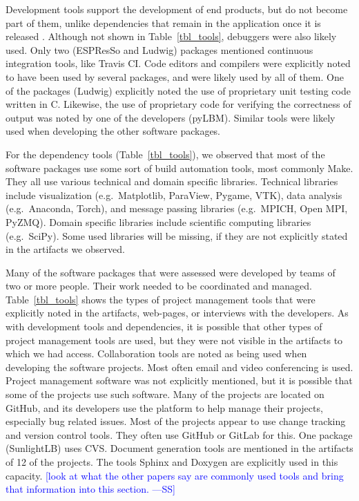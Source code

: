 \documentclass[final, 3p, times, authoryear]{elsarticle}
\newcommand{\authornote}[3]{\textcolor{#1}{[#3 ---#2]}}
\newcommand{\authornote}[3]{}
\newcommand{\wss}[1]{\authornote{blue}{SS}{#1}} %
\begin{document}
Development tools support the development of end products, but do not become
part of them, unlike dependencies that remain in the application once it is
released \citep{ghezzi1991fundamentals}. Although not shown in
Table~\ref{tbl_tools}, debuggers were also likely used.  Only two (ESPResSo and
Ludwig) packages mentioned continuous integration tools, like Travis CI. Code
editors and compilers were explicitly noted to have been used by several
packages, and were likely used by all of them. One of the packages (Ludwig)
explicitly noted the use of proprietary unit testing code written in C.
Likewise, the use of proprietary code for verifying the correctness of output
was noted by one of the developers (pyLBM). Similar tools were likely used when
developing the other software packages.

For the dependency tools (Table~\ref{tbl_tools}), we observed that most of the
software packages use some sort of build automation tools, most commonly Make.
They all use various technical and domain specific libraries. Technical
libraries include visualization (e.g.\ Matplotlib, ParaView, Pygame, VTK), data
analysis (e.g.\ Anaconda, Torch), and message passing libraries (e.g.\ MPICH,
Open MPI, PyZMQ). Domain specific libraries include scientific computing
libraries (e.g.\ SciPy). Some used libraries will be missing, if they are not
explicitly stated in the artifacts we observed.

Many of the software packages that were assessed were developed by teams of two
or more people. Their work needed to be coordinated and managed.
Table~\ref{tbl_tools} shows the types of project management tools that were
explicitly noted in the artifacts, web-pages, or interviews with the developers.
As with development tools and dependencies, it is possible that other types of
project management tools are used, but they were not visible in the artifacts to
which we had access.  Collaboration tools are noted as being used when
developing the software projects. Most often email and video conferencing is
used. Project management software was not explicitly mentioned, but it is
possible that some of the projects use such software. Many of the projects are
located on GitHub, and its developers use the platform to help manage their
projects, especially bug related issues. Most of the projects appear to use
change tracking and version control tools. They often use GitHub or GitLab for
this. One package (SunlightLB) uses CVS. Document generation tools are mentioned
in the artifacts of 12 of the projects. The tools Sphinx and Doxygen are
explicitly used in this capacity. \wss{look at what the other papers say are
commonly used tools and bring that information into this section.}
\end{document}
